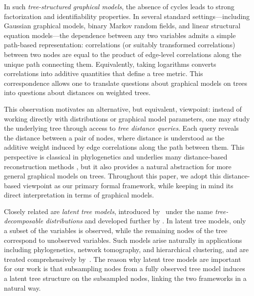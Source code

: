 \documentclass[12pt]{article}
\begin{document}
In such \emph{tree-structured graphical models}, the absence of cycles leads to strong factorization and identifiability properties. In several standard settings—including Gaussian graphical models, binary Markov random fields, and linear structural equation models—the dependence between any two variables admits a simple path-based representation: correlations (or suitably transformed correlations) between two nodes are equal to the product of edge-level correlations along the unique path connecting them. Equivalently, taking logarithms converts correlations into additive quantities that define a tree metric. This correspondence allows one to translate questions about graphical models on trees into questions about distances on weighted trees.

This observation motivates an alternative, but equivalent, viewpoint: instead of working directly with distributions or graphical model parameters, one may study the underlying tree through access to \emph{tree distance queries}. Each query reveals the distance between a pair of nodes, where distance is understood as the additive weight induced by edge correlations along the path between them. This perspective is classical in phylogenetics and underlies many distance-based reconstruction methods \citep{lake1994reconstructing,semple2003phylogenetics}, but it also provides a natural abstraction for more general graphical models on trees. Throughout this paper, we adopt this distance-based viewpoint as our primary formal framework, while keeping in mind its direct interpretation in terms of graphical models.

Closely related are \emph{latent tree models}, introduced by~\citet{Pearl88} under the name \emph{tree-decomposable distributions} and developed further by \citet{zhang04}. In latent tree models, only a subset of the variables is observed, while the remaining nodes of the tree correspond to unobserved variables. Such models arise naturally in applications including phylogenetics, network tomography, and hierarchical clustering, and are treated comprehensively by~\citet{Zw18}. The reason why latent tree models are important for our work is that subsampling nodes from a fully observed tree model induces a latent tree structure on the subsampled nodes, linking the two frameworks in a natural way.

\end{document}
